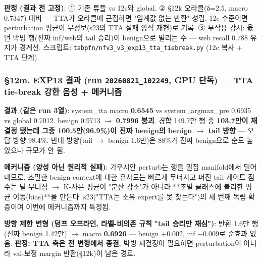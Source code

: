 \textbf{판정 (결과 전 고정)}: ① 기존 튜플 vs 12c와 global. ② §12k 오라클(δ=\allowbreak{}2.5, macro 0.7347) 대비 — TTA가 오라클에 근접하면 "임계값 없는 반환" 성립, 12c 수준이면 perturbation 평균이 무정보(s23의 TTA 실패 양식 재현)로 기록. ③ 부작용 감시: 옳던 박빙 행(진짜 inf/\allowbreak{}web의 tail 승리)이 benign으로 밀리는 수 — web recall 0.788 유지가 경계선. 스크립트: \texttt{tabpfn/\allowbreak{}\allowbreak{}n\allowbreak{}fv3\_\allowbreak{}\allowbreak{}v3\_\allowbreak{}\allowbreak{}e\allowbreak{}xp13\_\allowbreak{}\allowbreak{}tta\allowbreak{}\_\allowbreak{}\allowbreak{}tiebrea\allowbreak{}k.\allowbreak{}py} (12c 복사 +\allowbreak{} TTA 단계).

\subsubsection{§12m. EXP13 결과 (run \texttt{20260821\allowbreak{}\_\allowbreak{}\allowbreak{}102249}, GPU 단독) — TTA tie-break 강한 음성 +\allowbreak{} 메커니즘}
\textbf{결과 (같은 run 3열)}: system\_\allowbreak{}tta macro \textbf{0.6545} vs system\_\allowbreak{}argmax\_\allowbreak{}pre 0.6935 vs global 0.7012. benign 0.9713 \ensuremath{\rightarrow} \textbf{0.7996 붕괴}. 경합 149.7만 행 중 \textbf{103.7만이 재결정 됐는데 그중 100.5만(96.9\%)이 진짜 benign의 benign \ensuremath{\rightarrow} tail 방향} — 오답 방향 98.4\%. 반대 방향(tail \ensuremath{\rightarrow} benign 1.6만)은 88\%가 진짜 benign으로 순도 높았으나 규모가 안 됨.

\textbf{메커니즘 (양성 아닌 원리적 실패)}: 가우시안 perturb는 행을 밀집 manifold에서 밀어내므로, 조밀한 benign context에 대한 유사도는 빠르게 무너지고 퍼진 tail 게이트 점수는 덜 무너짐  \ensuremath{\rightarrow}  K-사본 평균이 "분산 감소"가 아니라 **조밀 클래스에 불리한 평균 이동(bias)**을 만든다. s23("TTA는 소유 expert를 못 찾는다")의 세 번째 독립 확증이며 이번에 메커니즘까지 특정됨.

\textbf{방향 제한 변형 (덤프 오프라인, 라벨-비의존 규칙 "tail 승리만 재심")}: 반환 1.6만 행(진짜 benign 1.42만)  \ensuremath{\rightarrow}  macro \textbf{0.6926} — benign +\allowbreak{}0.002, inf −0.009로 순효과 없음. \textbf{판정: TTA 축은 전 변형에서 종결.} 박빙 재결정이 필요하면 perturbation이 아니라 val-보정 margin 반환(§12k)이 남은 경로.

